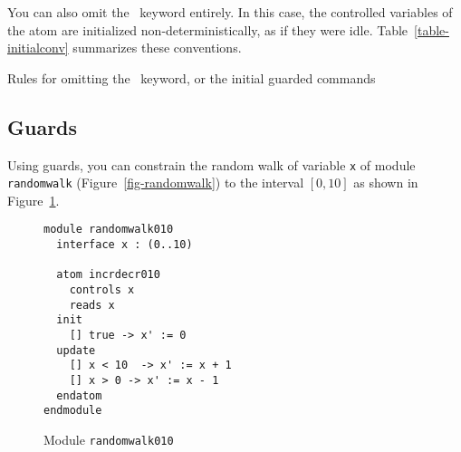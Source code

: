 You can also omit the \INIT\ keyword entirely.  In this case, the
controlled variables of the atom are initialized non-deterministically,
as if they were idle.  Table~\ref{table-initialconv} summarizes these
conventions. 

\begin{table}
\caption{Rules for omitting the \INIT\ keyword, or the initial guarded
commands}
\label{table-initialconv}
\end{table}


\subsection{Guards}

Using guards, you can constrain the random walk of variable {\tt x} of
module {\tt randomwalk} (Figure~\ref{fig-randomwalk}) to the interval
$[0, 10]$ as shown in Figure~\ref{fig-randomwalk010}. 

\begin{figure}
\begin{verbatim}
module randomwalk010
  interface x : (0..10)

  atom incrdecr010
    controls x
    reads x 
  init
    [] true -> x' := 0
  update 
    [] x < 10  -> x' := x + 1
    [] x > 0 -> x' := x - 1
  endatom
endmodule 
\end{verbatim}
\caption{Module {\tt randomwalk010}}
\label{fig-randomwalk010}
\end{figure}

